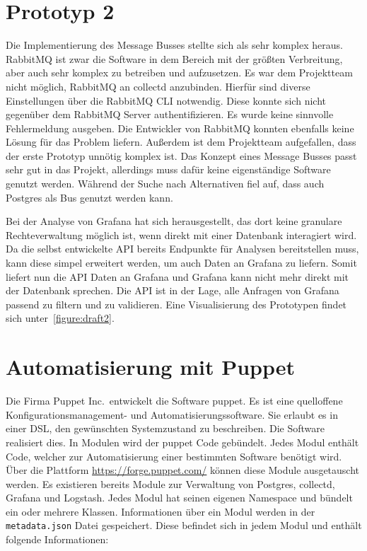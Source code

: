 \section{Prototyp 2}
Die Implementierung des Message Busses stellte sich als sehr komplex heraus.
RabbitMQ ist zwar die Software in dem Bereich mit der größten Verbreitung, aber
auch sehr komplex zu betreiben und aufzusetzen. Es war dem Projektteam nicht
möglich, RabbitMQ an collectd anzubinden. Hierfür sind diverse Einstellungen
über die RabbitMQ \gls{CLI} notwendig. Diese konnte sich nicht gegenüber dem
RabbitMQ Server authentifizieren. Es wurde keine sinnvolle Fehlermeldung
ausgeben. Die Entwickler von RabbitMQ konnten ebenfalls keine Lösung für das
Problem liefern. Außerdem ist dem Projektteam aufgefallen, dass der erste
Prototyp unnötig komplex ist. Das Konzept eines Message Busses passt sehr gut
in das Projekt, allerdings muss dafür keine eigenständige Software genutzt
werden. Während der Suche nach Alternativen fiel auf, dass auch Postgres als
Bus genutzt werden kann.

Bei der Analyse von Grafana hat sich herausgestellt, das dort keine granulare
Rechteverwaltung möglich ist, wenn direkt mit einer Datenbank interagiert wird.
Da die selbst entwickelte API bereits Endpunkte für Analysen bereitstellen
muss, kann diese simpel erweitert werden, um auch Daten an Grafana zu liefern.
Somit liefert nun die API Daten an Grafana und Grafana kann nicht mehr direkt
mit der Datenbank sprechen. Die API ist in der Lage, alle Anfragen von Grafana
passend zu filtern und zu validieren. Eine Visualisierung des Prototypen
findet sich unter~\ref{figure:draft2}.
\tm%

\section{Automatisierung mit Puppet}
Die Firma Puppet Inc.\ entwickelt die Software puppet. Es ist eine quelloffene
Konfigurationsmanagement- und Automatisierungssoftware. Sie erlaubt es in
einer  \gls{DSL}, den
gewünschten Systemzustand zu beschreiben. Die Software realisiert dies. In
Modulen wird der puppet Code gebündelt. Jedes Modul enthält Code, welcher zur
Automatisierung einer bestimmten Software benötigt wird. Über die Plattform
\url{https://forge.puppet.com/} können diese Module ausgetauscht werden. Es
existieren bereits Module zur Verwaltung von Postgres, collectd, Grafana und
Logstash. Jedes Modul hat seinen eigenen \gls{Namespace} und bündelt ein oder
mehrere Klassen. Informationen über ein Modul werden in der
\texttt{metadata.json} Datei gespeichert. Diese befindet sich in jedem Modul
und enthält folgende Informationen:


